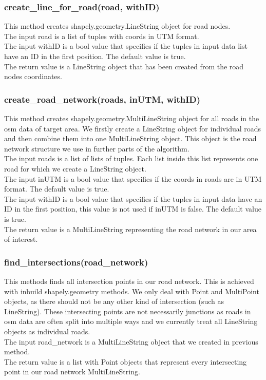 \documentclass[oneside]{article}
\begin{document}
            \subsubsection{create\_line\_for\_road(road, withID)}
            This method creates shapely.geometry.LineString object for road nodes.\\
            The input road is a list of tuples with coords in UTM format.\\
            The input withID is a bool value that specifies if the tuples in input data list have an ID in the first position. The default value is true.\\
            The return value is a LineString object that has been created from the road nodes coordinates.

            \subsubsection{create\_road\_network(roads, inUTM, withID)}
            This method creates shapely.geometry.MultiLineString object for all roads in the osm data of target area. We firstly create a LineString object for individual roads and then combine them into one MultiLineString object. This object is the road network structure we use in further parts of the algorithm.\\
            The input roads is a list of lists of tuples. Each list inside this list represents one road for which we create a LineString object.\\
            The input inUTM is a bool value that specifies if the coords in roads are in UTM format. The default value is true.\\
            The input withID is a bool value that specifies if the tuples in input data have an ID in the first position, this value is not used if inUTM is false. The default value is true.\\
            The return value is a MultiLineString representing the road network in our area of interest.

            \subsubsection{find\_intersections(road\_network)}
            This methods finds all intersection points in our road network. This is achieved with inbuild shapely.geometry methods. We only deal with Point and MultiPoint objects, as there should not be any other kind of intersection (such as LineString). These intersecting points are not necessarily junctions as roads in osm data are often split into multiple ways and we currently treat all LineString objects as individual roads.\\
            The input road\_network is a MultiLineString object that we created in previous method.\\
            The return value is a list with Point objects that represent every intersecting point in our road network MultiLineString.
\end{document}
